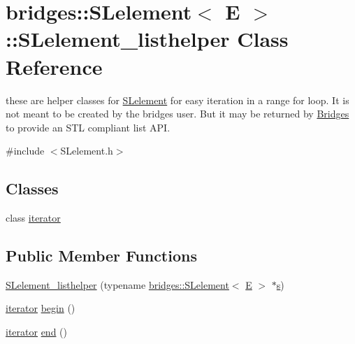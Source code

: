 \hypertarget{classbridges_1_1_s_lelement_1_1_s_lelement__listhelper}{}\section{bridges\+:\+:S\+Lelement$<$ E $>$\+:\+:S\+Lelement\+\_\+listhelper Class Reference}
\label{classbridges_1_1_s_lelement_1_1_s_lelement__listhelper}


these are helper classes for \hyperlink{classbridges_1_1_s_lelement}{S\+Lelement} for easy iteration in a range for loop. It is not meant to be created by the bridges user. But it may be returned by \hyperlink{classbridges_1_1_bridges}{Bridges} to provide an S\+TL compliant list A\+PI.  




{\ttfamily \#include $<$S\+Lelement.\+h$>$}

\subsection*{Classes}
\begin{DoxyCompactItemize}
\item 
class \hyperlink{classbridges_1_1_s_lelement_1_1_s_lelement__listhelper_1_1iterator}{iterator}
\end{DoxyCompactItemize}
\subsection*{Public Member Functions}
\begin{DoxyCompactItemize}
\item 
\hyperlink{classbridges_1_1_s_lelement_1_1_s_lelement__listhelper_a8185563b272397f9db1694577e3a110e}{S\+Lelement\+\_\+listhelper} (typename \hyperlink{classbridges_1_1_s_lelement}{bridges\+::\+S\+Lelement}$<$ \hyperlink{namespacebridges_acfb0a4f7877d8f63de3e6862004c50eda3a3ea00cfc35332cedf6e5e9a32e94da}{E} $>$ $\ast$\hyperlink{namespacebridges_acfb0a4f7877d8f63de3e6862004c50eda03c7c0ace395d80182db07ae2c30f034}{s})
\item 
\hyperlink{classbridges_1_1_s_lelement_1_1_s_lelement__listhelper_1_1iterator}{iterator} \hyperlink{classbridges_1_1_s_lelement_1_1_s_lelement__listhelper_a62443bbcdabeba6dc3a784f84375bc32}{begin} ()
\item 
\hyperlink{classbridges_1_1_s_lelement_1_1_s_lelement__listhelper_1_1iterator}{iterator} \hyperlink{classbridges_1_1_s_lelement_1_1_s_lelement__listhelper_ac3adfea9337ba2f237a667794e41a975}{end} ()
\end{DoxyCompactItemize}


